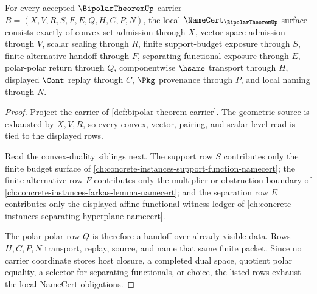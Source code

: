 \begin{theorem}
\label{thm:bipolar-theorem-namecert-obligations}
For every accepted $\BipolarTheoremUp$ carrier $B=(X,V,R,S,F,E,Q,H,C,P,N)$, the local $\NameCert_{\BipolarTheoremUp}$ surface consists exactly of convex-set admission through $X$, vector-space admission through $V$, scalar sealing through $R$, finite support-budget exposure through $S$, finite-alternative handoff through $F$, separating-functional exposure through $E$, polar-polar return through $Q$, componentwise $\hsame$ transport through $H$, displayed $\Cont$ replay through $C$, $\Pkg$ provenance through $P$, and local naming through $N$.
\end{theorem}
\begin{proof}
Project the carrier of \autoref{def:bipolar-theorem-carrier}. The geometric source is exhausted by $X,V,R$, so every convex, vector, pairing, and scalar-level read is tied to the displayed rows.

Read the convex-duality siblings next. The support row $S$ contributes only the finite budget surface of \autoref{ch:concrete-instances-support-function-namecert}; the finite alternative row $F$ contributes only the multiplier or obstruction boundary of \autoref{ch:concrete-instances-farkas-lemma-namecert}; and the separation row $E$ contributes only the displayed affine-functional witness ledger of \autoref{ch:concrete-instances-separating-hyperplane-namecert}.

The polar-polar row $Q$ is therefore a handoff over already visible data. Rows $H,C,P,N$ transport, replay, source, and name that same finite packet. Since no carrier coordinate stores host closure, a completed dual space, quotient polar equality, a selector for separating functionals, or choice, the listed rows exhaust the local NameCert obligations.
\end{proof}

